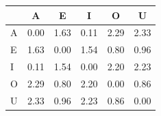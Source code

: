\begin{tabular}{lccccc}
\toprule
\rowcolor{col01}
 & A & E & I & O & U \\
\midrule
A & 0.00 & 1.63 & 0.11 & 2.29 & 2.33 \\
E & 1.63 & 0.00 & 1.54 & 0.80 & 0.96 \\
I & 0.11 & 1.54 & 0.00 & 2.20 & 2.23 \\
O & 2.29 & 0.80 & 2.20 & 0.00 & 0.86 \\
U & 2.33 & 0.96 & 2.23 & 0.86 & 0.00 \\
\bottomrule
\end{tabular}
